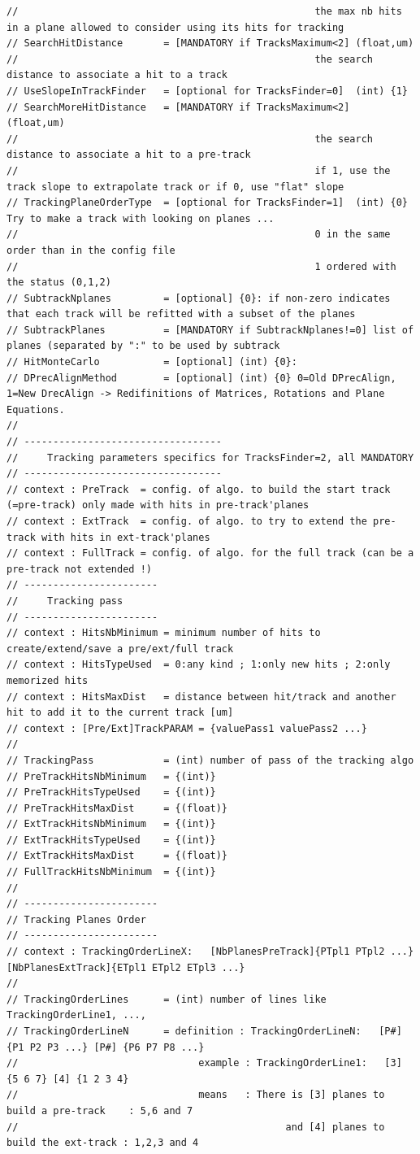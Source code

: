 \documentclass[a4paper, 12pt, twoside]{article}
\begin{document}
\begin{verbatim}
//                                                   the max nb hits in a plane allowed to consider using its hits for tracking
// SearchHitDistance       = [MANDATORY if TracksMaximum<2] (float,um)
//                                                   the search distance to associate a hit to a track
// UseSlopeInTrackFinder   = [optional for TracksFinder=0]  (int) {1}
// SearchMoreHitDistance   = [MANDATORY if TracksMaximum<2]   (float,um)
//                                                   the search distance to associate a hit to a pre-track
//                                                   if 1, use the track slope to extrapolate track or if 0, use "flat" slope
// TrackingPlaneOrderType  = [optional for TracksFinder=1]  (int) {0} Try to make a track with looking on planes ...
//                                                   0 in the same order than in the config file
//                                                   1 ordered with the status (0,1,2)
// SubtrackNplanes         = [optional] {0}: if non-zero indicates that each track will be refitted with a subset of the planes
// SubtrackPlanes          = [MANDATORY if SubtrackNplanes!=0] list of planes (separated by ":" to be used by subtrack
// HitMonteCarlo           = [optional] (int) {0}:
// DPrecAlignMethod        = [optional] (int) {0} 0=Old DPrecAlign, 1=New DrecAlign -> Redifinitions of Matrices, Rotations and Plane Equations.
//
// ----------------------------------
//     Tracking parameters specifics for TracksFinder=2, all MANDATORY
// ----------------------------------
// context : PreTrack  = config. of algo. to build the start track (=pre-track) only made with hits in pre-track'planes
// context : ExtTrack  = config. of algo. to try to extend the pre-track with hits in ext-track'planes
// context : FullTrack = config. of algo. for the full track (can be a pre-track not extended !)
// -----------------------
//     Tracking pass
// -----------------------
// context : HitsNbMinimum = minimum number of hits to create/extend/save a pre/ext/full track
// context : HitsTypeUsed  = 0:any kind ; 1:only new hits ; 2:only memorized hits
// context : HitsMaxDist   = distance between hit/track and another hit to add it to the current track [um]
// context : [Pre/Ext]TrackPARAM = {valuePass1 valuePass2 ...}
//
// TrackingPass            = (int) number of pass of the tracking algo
// PreTrackHitsNbMinimum   = {(int)}
// PreTrackHitsTypeUsed    = {(int)}
// PreTrackHitsMaxDist     = {(float)}
// ExtTrackHitsNbMinimum   = {(int)}
// ExtTrackHitsTypeUsed    = {(int)}
// ExtTrackHitsMaxDist     = {(float)}
// FullTrackHitsNbMinimum  = {(int)}
//
// -----------------------
// Tracking Planes Order
// -----------------------
// context : TrackingOrderLineX:   [NbPlanesPreTrack]{PTpl1 PTpl2 ...} [NbPlanesExtTrack]{ETpl1 ETpl2 ETpl3 ...}
//
// TrackingOrderLines      = (int) number of lines like TrackingOrderLine1, ...,
// TrackingOrderLineN      = definition : TrackingOrderLineN:   [P#] {P1 P2 P3 ...} [P#] {P6 P7 P8 ...}
//                               example : TrackingOrderLine1:   [3] {5 6 7} [4] {1 2 3 4}
//                               means   : There is [3] planes to build a pre-track    : 5,6 and 7
//                                              and [4] planes to build the ext-track : 1,2,3 and 4


\end{verbatim}
\end{document}
